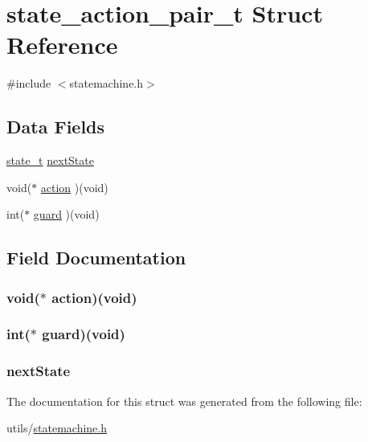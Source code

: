 \hypertarget{structstate__action__pair__t}{\section{state\-\_\-action\-\_\-pair\-\_\-t Struct Reference}
\label{structstate__action__pair__t}
}


{\ttfamily \#include $<$statemachine.\-h$>$}

\subsection*{Data Fields}
\begin{DoxyCompactItemize}
\item 
\hyperlink{statemachine_8h_a70fb3cb460ce19a89130b2787e73d71d}{state\-\_\-t} \hyperlink{structstate__action__pair__t_ab624469c5d07f2d4eaa06222897de692}{next\-State}
\item 
void($\ast$ \hyperlink{structstate__action__pair__t_a43217ef1cea500d112535a1f9c596a26}{action} )(void)
\item 
int($\ast$ \hyperlink{structstate__action__pair__t_afe74d1bcda760b98bbac7b294462ac88}{guard} )(void)
\end{DoxyCompactItemize}


\subsection{Field Documentation}
\hypertarget{structstate__action__pair__t_a43217ef1cea500d112535a1f9c596a26}{
\subsubsection[{action}]{\setlength{\rightskip}{0pt plus 5cm}void($\ast$ action)(void)}}\label{structstate__action__pair__t_a43217ef1cea500d112535a1f9c596a26}
\hypertarget{structstate__action__pair__t_afe74d1bcda760b98bbac7b294462ac88}{
\subsubsection[{guard}]{\setlength{\rightskip}{0pt plus 5cm}int($\ast$ guard)(void)}}\label{structstate__action__pair__t_afe74d1bcda760b98bbac7b294462ac88}
\hypertarget{structstate__action__pair__t_ab624469c5d07f2d4eaa06222897de692}{
\subsubsection[{next\-State}]{ next\-State}}\label{structstate__action__pair__t_ab624469c5d07f2d4eaa06222897de692}


The documentation for this struct was generated from the following file\-:\begin{DoxyCompactItemize}
\item 
utils/\hyperlink{statemachine_8h}{statemachine.\-h}\end{DoxyCompactItemize}
